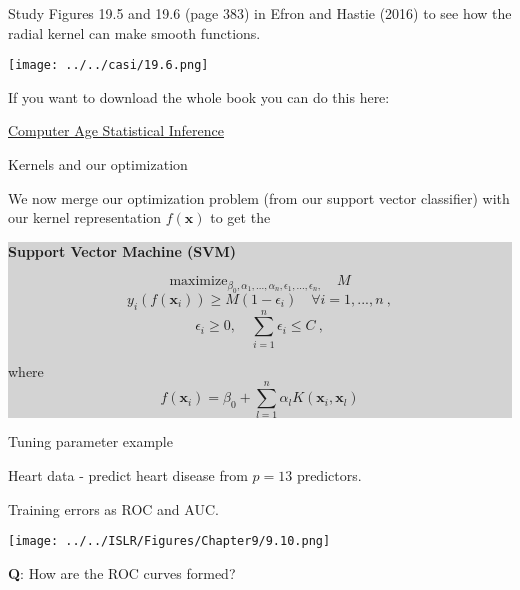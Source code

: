 \documentclass[10pt,ignorenonframetext,]{beamer}
\begin{document}
\begin{frame}

Study Figures 19.5 and 19.6 (page 383) in Efron and Hastie (2016) to see
how the radial kernel can make smooth functions.

\centering

\texttt{[image: ../../casi/19.6.png]}

\flushleft
\small

If you want to download the whole book you can do this here:

\href{https://web.stanford.edu/~hastie/CASI_files/PDF/casi.pdf}{Computer
Age Statistical Inference}

\end{frame}

\begin{frame}

\begin{block}{Kernels and our optimization}

\vspace{2mm}

We now merge our optimization problem (from our support vector
classifier) with our kernel representation \(f({\boldsymbol x})\) to get
the \vspace{2mm}

\colorbox{lightgray}{\begin{minipage}{10cm}
{\bf Support Vector Machine (SVM)}

$$\mathrm{maximize}_{\beta_0,\alpha_1,...,\alpha_n,\epsilon_1,...,\epsilon_n,} \quad M $$
$$y_i(f({\boldsymbol x}_i))\geq M(1-\epsilon_i) \quad  \forall i=1,...,n \ ,$$
$$\epsilon_i\geq 0, \quad \sum_{i=1}^n \epsilon_i \leq C \ ,$$

where 
$$f({\boldsymbol x}_i)=\beta_0 +\sum_{l=1}^n \alpha_l K({\boldsymbol x}_i,{\boldsymbol x}_l)$$
\end{minipage}}

\end{block}

\end{frame}

\begin{frame}

\begin{block}{Tuning parameter example}

\vspace{2mm}

Heart data - predict heart disease from \(p=13\) predictors.

Training errors as ROC and AUC.

\vspace{1mm}

\centering

\texttt{[image: ../../ISLR/Figures/Chapter9/9.10.png]}

\textbf{Q}: How are the ROC curves formed?

\end{block}

\end{frame}
\end{document}
